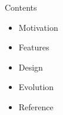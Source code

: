\begin{frame}
  \titlepage
\end{frame}

\begin{frame}{Contents}
    \begin{itemize}
    \item \alert{Motivation}
    \item \alert{Features}
    \item \alert{Design}
    \item \alert{Evolution}
    \item \alert{Reference}    
    \end{itemize}
\end{frame}